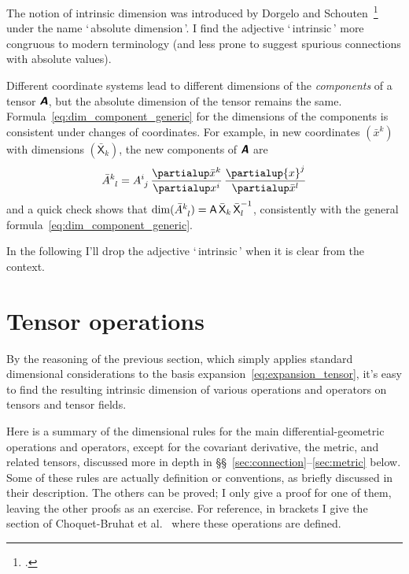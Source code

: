 \documentclass[\ifafour a4paper,12pt,\else a5paper,10pt,\fi%
onecolumn,oneside,article,%
british%
]{memoir}
\newcommand*{\defquote}[1]{`\,#1\,'}
\theoremstyle{remark}
\theoremstyle{innote}
\newcommand*{\mathte}[1]{\textbf{\textit{\textsf{#1}}}}
\newcommand*{\citep}{\footcites}
\newcommand*{\citey}{\parencites*}%
\newcommand*{\de}{\partialup}%
\renewcommand*{\|}[1][]{\nonscript\,#1\vert\nonscript\;\mathopen{}}
\newcommand*{\sects}{\S\S}%
\newcommand*{\chap}{ch.}%
\newcommand*{\etal}{{et al.}}
\newcommand*{\Xx}{\textsf{X}}
\newcommand*{\Aa}{\textsf{A}}
\newcommand*{\yA}{\mathte{A}}
\renewcommand*{\i}{\indices}
\begin{document}
The notion of intrinsic dimension was introduced by Dorgelo and
Schouten~\citep{dorgeloetal1946}[\chap~VI]{schouten1951_r1989} under the
name \defquote{absolute dimension}. I find the adjective
\defquote{intrinsic} more congruous to modern terminology (and less prone
to suggest spurious connections with absolute values).



\medskip

Different coordinate systems lead to different dimensions of the
\emph{components} of a tensor $\yA$, but the absolute dimension of the
tensor remains the same. Formula~\eqref{eq:dim_component_generic} for the
dimensions of the components is consistent under changes of coordinates.
For example, in new coordinates $({\bar{x}}^{k})$ with dimensions
$({\bar{\Xx}}_{k})$, the new components of $\yA$ are
\begin{equation}
  \label{eq:coords_change}
  \bar{A}\i{^{k}_{l}} = A\i{^{i}_{j}}
  \,\frac{\de \bar{x}^{k}}{\de x^{i}}
  \,\frac{\de {x}^{j}}{\de \bar{x}^{l}}
\end{equation}
and a quick check shows that
$\dim(\bar{A}\i{^{k}_{l}}) = \Aa\,\bar{\Xx}_{k}\,{\bar{\Xx}_{l}}^{-1}$, consistently
with the general formula~\eqref{eq:dim_component_generic}. %

\smallskip

In the following I'll drop the adjective \defquote{intrinsic} when it is
clear from the context.

\section{Tensor operations}
\label{sec:tensor_ops}

By the reasoning of the previous section, which simply applies standard
dimensional considerations to the basis
expansion~\eqref{eq:expansion_tensor}, it's easy to find the resulting
intrinsic dimension of various operations and operators on tensors and
tensor fields.

Here is a summary of the dimensional rules for the main
differential-geometric operations and operators, except for the covariant
derivative, the metric, and related tensors, discussed more in depth in
\sects~\ref{sec:connection}--\ref{sec:metric} below. Some of these rules
are actually definition or conventions, as briefly discussed in their
description. The others can be proved; I only give a proof for one of them,
leaving the other proofs as an exercise. For reference, in brackets I give
the section of Choquet-Bruhat \etal\ \citey{choquetbruhatetal1977_r1996}
where these operations are defined.
\end{document}
